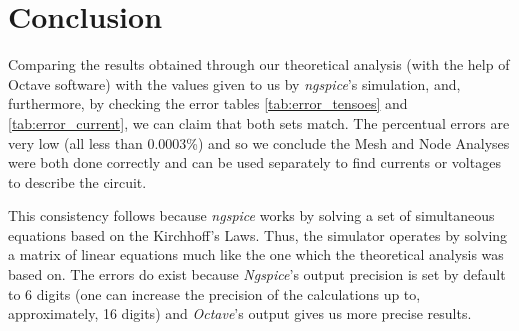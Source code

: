 \section{Conclusion}
\label{sec:conclusion}

Comparing the results obtained through our theoretical analysis (with the help of Octave
software) with the values given to us by \emph{ngspice}'s simulation, and, furthermore, by checking the
error tables \ref{tab:error_tensoes} and \ref{tab:error_current}, we can claim that both sets match. The percentual
errors are very low (all less than 0.0003\%) and so we conclude the Mesh and Node Analyses were both done
correctly and can be used separately to find currents or voltages to describe the circuit.

\par

This consistency follows because \emph{ngspice} works by solving a set of simultaneous equations
based on the Kirchhoff's Laws. Thus, the simulator operates by solving a matrix of linear equations much
like the one which the theoretical analysis was based on. The errors do exist because \emph{Ngspice}'s output
precision is set by default to 6 digits (one can increase the precision of the calculations up to, approximately,
16 digits) and \emph{Octave}'s output gives us more precise results.
